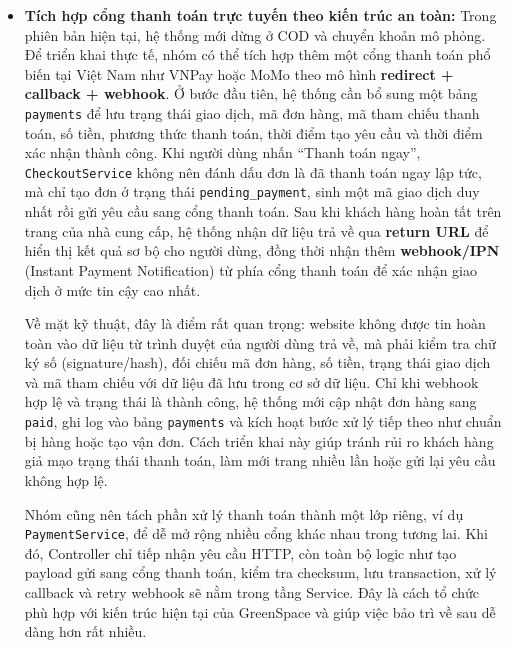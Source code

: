 \documentclass[11pt, a4paper]{article}
\begin{document}
\begin{itemize}[leftmargin=*]
    \item \textbf{Tích hợp cổng thanh toán trực tuyến theo kiến trúc an toàn:}
    Trong phiên bản hiện tại, hệ thống mới dừng ở COD và chuyển khoản mô
    phỏng. Để triển khai thực tế, nhóm có thể tích hợp thêm một cổng thanh
    toán phổ biến tại Việt Nam như VNPay hoặc MoMo theo mô hình
    \textbf{redirect + callback + webhook}. Ở bước đầu tiên, hệ thống cần
    bổ sung một bảng \texttt{payments} để lưu trạng thái giao dịch, mã đơn
    hàng, mã tham chiếu thanh toán, số tiền, phương thức thanh toán, thời
    điểm tạo yêu cầu và thời điểm xác nhận thành công. Khi người dùng nhấn
    ``Thanh toán ngay'', \texttt{CheckoutService} không nên đánh dấu đơn là
    đã thanh toán ngay lập tức, mà chỉ tạo đơn ở trạng thái
    \texttt{pending\_payment}, sinh một mã giao dịch duy nhất rồi gửi yêu cầu
    sang cổng thanh toán. Sau khi khách hàng hoàn tất trên trang của nhà cung
    cấp, hệ thống nhận dữ liệu trả về qua \textbf{return URL} để hiển thị kết
    quả sơ bộ cho người dùng, đồng thời nhận thêm \textbf{webhook/IPN}
    (Instant Payment Notification) từ phía cổng thanh toán để xác nhận giao
    dịch ở mức tin cậy cao nhất.

    Về mặt kỹ thuật, đây là điểm rất quan trọng: website không được tin hoàn
    toàn vào dữ liệu từ trình duyệt của người dùng trả về, mà phải kiểm tra
    chữ ký số (signature/hash), đối chiếu mã đơn hàng, số tiền, trạng thái
    giao dịch và mã tham chiếu với dữ liệu đã lưu trong cơ sở dữ liệu. Chỉ khi
    webhook hợp lệ và trạng thái là thành công, hệ thống mới cập nhật đơn hàng
    sang \texttt{paid}, ghi log vào bảng \texttt{payments} và kích hoạt bước
    xử lý tiếp theo như chuẩn bị hàng hoặc tạo vận đơn. Cách triển khai này
    giúp tránh rủi ro khách hàng giả mạo trạng thái thanh toán, làm mới trang
    nhiều lần hoặc gửi lại yêu cầu không hợp lệ.

    Nhóm cũng nên tách phần xử lý thanh toán thành một lớp riêng, ví dụ
    \texttt{PaymentService}, để dễ mở rộng nhiều cổng khác nhau trong tương
    lai. Khi đó, Controller chỉ tiếp nhận yêu cầu HTTP, còn toàn bộ logic như
    tạo payload gửi sang cổng thanh toán, kiểm tra checksum, lưu transaction,
    xử lý callback và retry webhook sẽ nằm trong tầng Service. Đây là cách tổ
    chức phù hợp với kiến trúc hiện tại của GreenSpace và giúp việc bảo trì về
    sau dễ dàng hơn rất nhiều.


\end{itemize}
\end{document}
